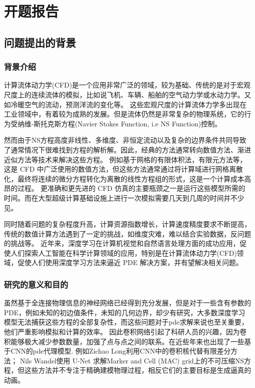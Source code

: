 \clearpage
\chapter{开题报告}
\section{问题提出的背景}

\subsection{背景介绍}
计算流体动力学(CFD)是一个应用非常广泛的领域，较为基础、传统的是对于宏观尺度上的连续流体的模拟，比如说飞机、车辆、船舶的空气动力学或水动力学。又如冷暖空气的流动，预测洋流的变化等。
这些宏观尺度的计算流体力学多出现在工业领域中，有着较为成熟的发展。但是流体仍然是非常复杂的物理系统，它的行为受纳维-斯托克斯方程(Navier Stokes Function, i.e NS Function)控制。

然而由于NS方程高度非线性、多维度、非恒定流动以及复杂的边界条件共同导致了通常情况下很难找到方程的解析解。因此，经典的方法通常转向数值方法、渐进近似方法等技术来解决这些方程。
例如基于网格的有限体积法，有限元方法等，这是 CFD 中广泛使用的数值方法，但这些方法通常通过将计算域进行网格离散化，最终将连续的微分方程转化为离散的线性方程组的形式，这是一个计算成本高昂的过程。
更准确和更先进的 CFD 仿真的主要瓶颈之一是运行这些模型所需的时间。而在大型超级计算基础设施上进行一次模拟需要几天到几周的时间并不少见。

同时随着问题的复杂程度升高，计算资源指数增长，计算速度精度要求不断提高，传统的数值计算方法遇到了一定的挑战，如维度灾难，难以结合实验数据，反问题的挑战等。
近年来，深度学习在计算机视觉和自然语言处理方面的成功应用，促使人们探索人工智能在科学计算领域的应用，特别是在计算流体动力学(CFD)领域，促使人们使用深度学习方法来逼近 PDE 解决方案，并有望解决相关问题。



\subsection{研究的意义和目的}
虽然基于全连接物理信息的神经网络已经得到充分发展，但是对于一些含有参数的PDE，例如未知的初边值条件，未知的几何边界，却少有研究，大多数深度学习模型无法捕获这些方程的全部复杂性，而这些问题对于pde求解来说也至关重要，他们严重影响模拟和计算的效率。
因此卷积网络引起了科研人员的兴趣，因为卷积能够极大减少参数数量，加强了点与点之间的联系。在近些年来也出现了一些基于CNN的pde代理模型.
例如Zichao Long利用CNN中的卷积核代替有限差分方法\cite{pmlr-v80-long18a}；
Nils Wandel使用 U-Net 求解Marker and Cell (MAC) grid上的不可压缩NS方程\cite{Wandel2021Learning}，但这些方法并不专注于精确建模物理过程，相反它们的主要目标是生成逼真的动画。

